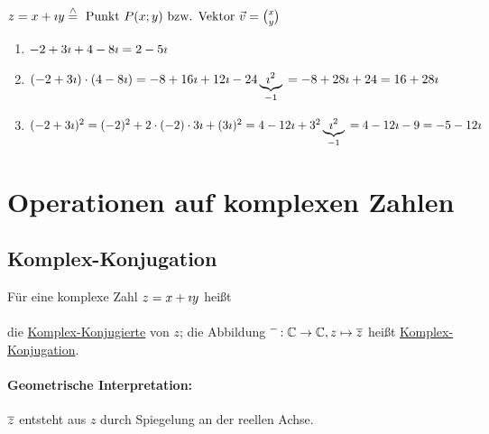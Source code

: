 $z=x+\imath y \stackrel{\wedge}{=} \text{ Punkt } P(x;y)\text{ bzw. Vektor }\vec{v}=\binom{x}{y}$


\Bsps
\begin{enumerate}
	\item $-2+3\imath+4-8\imath\\
	= 2-5\imath$
	
	\item $(-2+3\imath)\cdot(4-8\imath)\\
	= -8 +16\imath+12\imath-24\underbrace{\imath^2}_{-1}\\
	= -8+28\imath+24\\
	= 16+28\imath$
	
	\item $(-2+3\imath)^2=(-2)^2+2\cdot(-2)\cdot3\imath+(3\imath)^2\\
	=4-12\imath+3^2\underbrace{\imath^2}_{-1}\\
	=4-12\imath-9\\
	=-5-12\imath$
\end{enumerate}

\clearpage
\section{Operationen auf komplexen Zahlen}
\subsection{Komplex-Konjugation}

\Def Für eine komplexe Zahl $z = x+\imath y$ heißt\vspace{1ex}\\
\vspace{1ex}\\
die \underline{Komplex-Konjugierte} von $z$; die Abbildung $\ol{\color{white}z}:\C\to\C,z\mapsto \ol{z}$ heißt \underline{Komplex-Konjugation}.

\paragraph{Geometrische Interpretation:}
$\overline{z}$ entsteht aus $z$ durch Spiegelung an der reellen Achse.


\clearpage
{}

